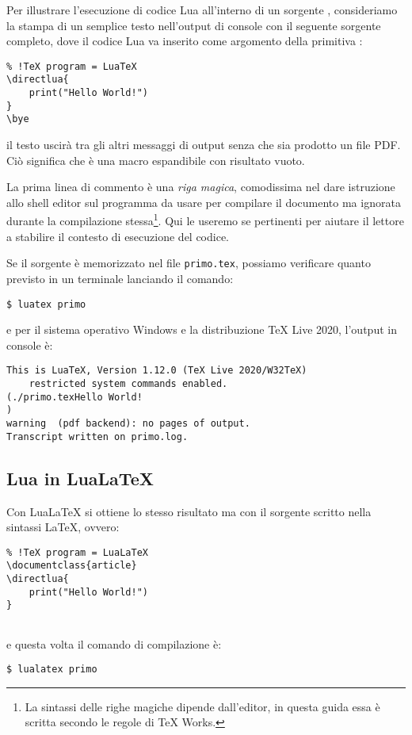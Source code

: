 Per illustrare l'esecuzione di codice Lua all'interno di un sorgente \LuaTeX,
consideriamo la stampa di un semplice testo nell'output di console con il
seguente sorgente completo, dove il codice Lua va inserito come argomento della
primitiva :
\begin{Verbatim}
% !TeX program = LuaTeX
\directlua{
    print("Hello World!")
}
\bye
\end{Verbatim}
il testo uscirà tra gli altri messaggi di output senza che sia prodotto un file
PDF. Ciò significa che  è una macro espandibile con risultato
vuoto.

La prima linea di commento è una \emph{riga magica}, comodissima nel dare
istruzione allo shell editor sul programma da usare per compilare il documento
ma ignorata durante la compilazione stessa\footnote{La sintassi delle righe
magiche dipende dall'editor, in questa guida essa è scritta secondo le regole
di TeX Works.}. Qui le useremo se pertinenti per aiutare il lettore a
stabilire il contesto di esecuzione del codice.

Se il sorgente è memorizzato nel file \texttt{primo.tex}, possiamo verificare
quanto previsto in un terminale lanciando il comando:
\begin{Verbatim}
$ luatex primo
\end{Verbatim}
e per il sistema operativo Windows e la distribuzione TeX Live 2020, l'output
in console è:
\begin{Verbatim}
This is LuaTeX, Version 1.12.0 (TeX Live 2020/W32TeX) 
    restricted system commands enabled.
(./primo.texHello World!
)
warning  (pdf backend): no pages of output.
Transcript written on primo.log.
\end{Verbatim}


\subsection{Lua in Lua\LaTeX}

Con Lua\LaTeX{} si ottiene lo stesso risultato ma con il sorgente scritto nella
sintassi \LaTeX, ovvero:
\begin{Verbatim}
% !TeX program = LuaLaTeX
\documentclass{article}
\directlua{
    print("Hello World!")
}


\end{Verbatim}
e questa volta il comando di compilazione è:
\begin{Verbatim}
$ lualatex primo
\end{Verbatim}

